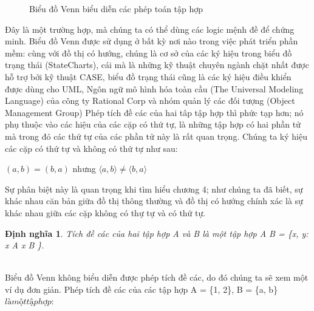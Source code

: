 \documentclass[11pt,a4paper,oneside]{article}
\newtheorem{modeling_def}{Định nghĩa }
\begin{document}
\begin{figure}[htb]
\setlength\fboxsep{1mm}
\setlength\fboxrule{1pt}
\begin{center}
\caption{Biểu đồ Venn biểu diễn các phép toán tập hợp}
\label{fig:mtran_ima2}
\end{center}
\end{figure}
Đây là một trường hợp, mà chúng ta có thể dùng các logic mệnh đề để chứng minh.
Biểu đồ Venn được sử dụng ở bất kỳ nơi nào trong việc phát triển phần mềm: cùng với đồ thị có hướng, chúng là cơ sở của các ký hiệu trong biểu đồ trạng thái (StateCharts), cái mà là những kỹ thuật chuyên ngành chặt nhất được hỗ trợ bởi kỹ thuật CASE, biểu đồ trạng thái cũng là các ký hiệu điều khiển được dùng cho UML, Ngôn ngữ mô hình hóa toàn cầu (The Universal Modeling Language) của công ty Rational Corp và nhóm quản lý các đối tượng (Object Management Group)
Phép tích đề các của hai tâp tập hợp thì phức tạp hơn; nó phụ thuộc vào các hiệu của các cặp có thứ tự, là những tập hợp có hai phần tử mà trong đó các thứ tự của các phần tử này là rất quan trọng. Chúng ta ký hiệu các cặp có thứ tự và không có thứ tự như sau:

\begin{center}
$\left(a, b\right) = \left(b, a\right) $ nhưng $ \langle a, b \rangle \neq \langle b, a \rangle$
\end{center}

Sự phân biệt này là quan trọng khi tìm hiểu chương 4; như chúng ta đã biết, sự khác nhau căn bản giữa đồ thị thông thường và đồ thị có hướng chính xác là sự khác nhau giữa các cặp không có thự tự và có thứ tự.

\begin{modeling_def}
Tích đề các của hai tập hợp A và B là một tập hợp A \times B = \left\{\left\langle x, y\right\range : x \in A \land  x \in B \right\}.\\
\end{modeling_def}
\\
Biểu đồ Venn không biểu diễn được phép tích đề các, do đó chúng ta sẽ xem một ví dụ đơn giản. Phép tích đề các của các tập hợp A = \left\{1, 2\right\}, B = \left\{a, b\right\} $ là một tập hợp:$
\end{document}
